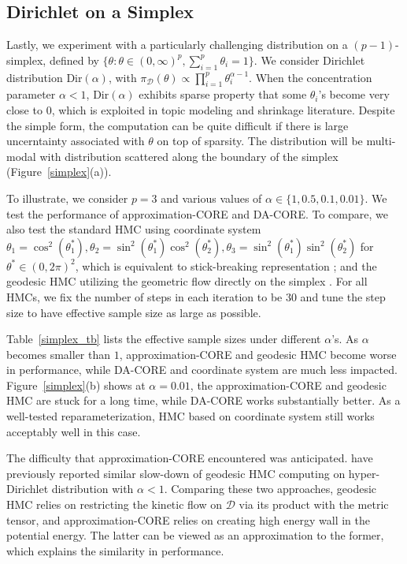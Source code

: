 \documentclass[10pt,fleqn]{article}
\newcommand{\mc}[1]{\mathcal{#1}}
\DeclareMathOperator{\1}{\mathbbm{1}}
\begin{document}
\subsection{Dirichlet on a Simplex}
Lastly, we experiment with a particularly challenging distribution on a 
$(p-1)$-simplex, defined by $\{\theta: \theta\in(0,\infty)^p,\sum_{i=1}^p \theta_i=1\}$. We consider Dirichlet distribution $\text{Dir}(\alpha)$, with
$\pi_{\mc D}(\theta)\propto \prod_{i=1}^p\theta_i^{\alpha-1}$. When the concentration
parameter $\alpha<1$, $\text{Dir}(\alpha)$ exhibits sparse property that some $\theta_i$'s become very close to $0$, which is exploited in topic modeling \citep{wang2009decoupling} and shrinkage
\citep{bhattacharya2015dirichlet} literature. Despite the simple form, the computation can be quite difficult
 if there is large uncerntainty associated with $\theta$ on top of sparsity.
 The distribution will be multi-modal with distribution scattered along the boundary of the simplex (Figure~\ref{simplex}(a)).

To illustrate, we consider $p=3$ and various values of $\alpha\in \{1,0.5,0.1,0.01\}$. We test the performance of approximation-CORE and DA-CORE. To compare, we also test the standard HMC using coordinate
system $\theta_1=\cos^2(\theta_1^*), \theta_2=\sin^2(\theta_1^*)\cos^2(\theta_2^*), \theta_3=\sin^2(\theta_1^*)\sin^2(\theta_2^*)$ for $\theta^*\in (0,2\pi)^2$,
which is equivalent to stick-breaking representation \citep{ishwaran2001gibbs}; and the geodesic
HMC utilizing the geometric flow directly on the simplex \citep{byrne2013geodesic}.
For all HMCs, we fix the number of steps in each iteration to be $30$ and tune the step size to have  effective sample size as large as possible.

Table~\ref{simplex_tb} lists the effective sample sizes under different $\alpha$'s.
As $\alpha$ becomes smaller than $1$, approximation-CORE and geodesic HMC become worse in performance, while DA-CORE
 and coordinate system are much less impacted.
Figure~\ref{simplex}(b) shows at $\alpha=0.01$, the approximation-CORE and geodesic
HMC are stuck for a long time, while DA-CORE works substantially better. As a well-tested reparameterization,  HMC based on coordinate system still works acceptably well in this case.

The difficulty that approximation-CORE encountered was  anticipated. \cite{byrne2013geodesic} have previously reported similar
slow-down of geodesic HMC computing on hyper-Dirichlet  distribution \citep{hankin2010generalization} with $\alpha<1$. Comparing these two approaches, geodesic HMC relies on restricting the kinetic flow on $\mc D$ via its product with the metric tensor, and approximation-CORE relies
on creating high energy wall in the potential energy. The latter can
be viewed as an approximation
to the former, which explains the similarity in performance.
\end{document}
